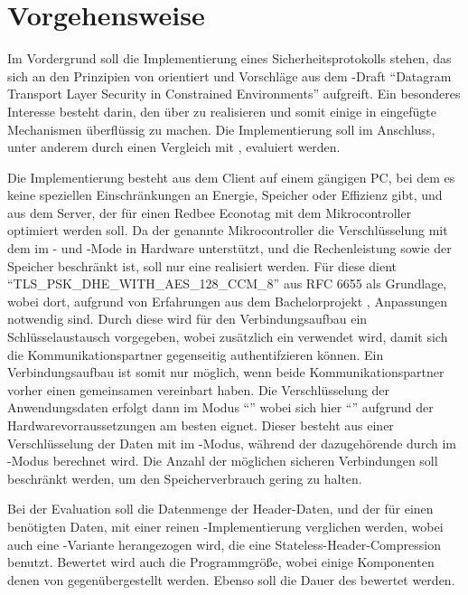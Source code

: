 \section{Vorgehensweise}

Im Vordergrund soll die Implementierung eines Sicherheitsprotokolls stehen, das sich an den Prinzipien von  orientiert
und Vorschläge aus dem -Draft "`Datagram Transport Layer Security in Constrained Environments"' \cite{draftcodtls} aufgreift.
Ein besonderes Interesse besteht darin, den  über  \cite{draftcoap13} zu realisieren und somit einige in  eingefügte
Mechanismen überflüssig zu machen. Die Implementierung soll im Anschluss, unter anderem durch einen Vergleich mit , evaluiert werden.

Die Implementierung besteht aus dem Client auf einem gängigen PC, bei dem es keine speziellen Einschränkungen an Energie,
Speicher oder Effizienz gibt, und aus dem Server, der für einen Redbee Econotag \cite{econotag} mit dem  \cite{mc1322}
Mikrocontroller optimiert werden soll. Da der genannte Mikrocontroller die Verschlüsselung mit dem  im - und -Mode
in Hardware unterstützt, und die Rechenleistung sowie der Speicher beschränkt ist, soll nur eine  realisiert werden.
Für diese dient "`TLS\_PSK\_DHE\_WITH\_AES\_128\_CCM\_8"' aus RFC 6655 \cite{rfc6655} als Grundlage, wobei dort, aufgrund von Erfahrungen
aus dem Bachelorprojekt , Anpassungen notwendig sind. Durch diese wird für den Verbindungsaufbau ein Schlüsselaustausch vorgegeben, wobei zusätzlich
ein  verwendet wird, damit sich die Kommunikationspartner gegenseitig authentifzieren können. Ein Verbindungsaufbau ist somit nur möglich,
wenn beide Kommunikationspartner vorher einen gemeinsamen  vereinbart haben. Die Verschlüsselung der Anwendungsdaten erfolgt dann im Modus
"`"' \cite{rfc5116} wobei sich hier "`"' \cite{rfc3610} aufgrund der Hardwarevorraussetzungen am besten eignet. Dieser besteht
aus einer Verschlüsselung der Daten mit  im -Modus, während der dazugehörende  durch  im -Modus
berechnet wird. Die Anzahl der möglichen sicheren Verbindungen soll beschränkt werden, um den Speicherverbrauch gering zu halten.

Bei der Evaluation soll die Datenmenge der Header-Daten, und der für einen  benötigten Daten, mit einer reinen -Implementierung
verglichen werden, wobei auch eine -Variante herangezogen wird, die eine Stateless-Header-Compression benutzt. Bewertet wird auch die Programmgröße,
wobei einige Komponenten denen von  gegenübergestellt werden. Ebenso soll die Dauer des  bewertet werden.